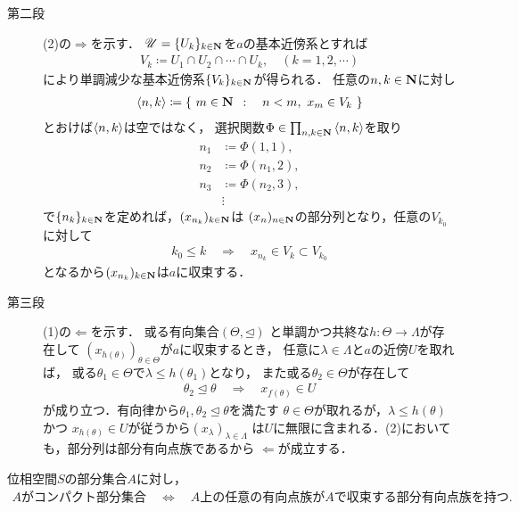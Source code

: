 \begin{prf}
\begin{description}
			\item[第二段] (2)の$\Longrightarrow$を示す．
				$\mathscr{U} = \{U_k\}_{k \in \mathbf{N}}$を$a$の基本近傍系とすれば
				\begin{align}
					V_k \coloneqq U_1 \cap U_2 \cap \cdots \cap U_k,
					\quad (k=1,2,\cdots)
				\end{align}
				により単調減少な基本近傍系$\{V_k\}_{k \in \mathbf{N}}$が得られる．
				任意の$n,k \in \mathbf{N}$に対し
				\begin{align}
					\inprod<n,k> \coloneqq
					\Set{m \in \N}{n < m,\ x_m \in V_k}
				\end{align}
				とおけば$\inprod<n,k>$は空ではなく，
				選択関数$\Phi \in \prod_{n,k \in \N} \inprod<n,k>$を取り
				\begin{align}
					n_1 &\coloneqq \Phi(1,1), \\
					n_2 &\coloneqq \Phi(n_1,2), \\
					n_3 &\coloneqq \Phi(n_2,3), \\
					&\vdots
				\end{align}
				で$\{n_k\}_{k \in \mathbf{N}}$を定めれば，$(x_{n_k})_{k \in \mathbf{N}}$は
				$(x_n)_{n \in \mathbf{N}}$の部分列となり，任意の$V_{k_0}$に対して
				\begin{align}
					k_0 \leq k \quad \Longrightarrow \quad
					x_{n_k} \in V_k \subset V_{k_0}
				\end{align}
				となるから$(x_{n_k})_{k \in \mathbf{N}}$は$a$に収束する．
		
			\item[第三段] (1)の$\Longleftarrow$を示す．
				或る有向集合$(\Theta,\unlhd)$
				と単調かつ共終な$h:\Theta \longrightarrow \Lambda$が存在して
				$(x_{h(\theta)})_{\theta \in \Theta}$が$a$に収束するとき，
				任意に$\lambda \in \Lambda$と$a$の近傍$U$を取れば，
				或る$\theta_1 \in \Theta$で$\lambda \leq h(\theta_1)$となり，
				また或る$\theta_2 \in \Theta$が存在して
				\begin{align}
					\theta_2 \unlhd \theta \quad \Longrightarrow \quad
					x_{f(\theta)} \in U
				\end{align}
				が成り立つ．有向律から$\theta_1,\theta_2 \unlhd \theta$を満たす
				$\theta \in \Theta$が取れるが，$\lambda \leq h(\theta)$かつ
				$x_{h(\theta)} \in U$が従うから$(x_\lambda)_{\lambda \in \Lambda}$
				は$U$に無限に含まれる．(2)においても，部分列は部分有向点族であるから
				$\Longleftarrow$が成立する．
				\QED
		\end{description}
	\end{prf}
	
	\begin{screen}
		\begin{thm}
		\label{thm:compact_iff_every_net_has_a_convergent_subnet}
			位相空間$S$の部分集合$A$に対し，
			\begin{align}
				\mbox{$A$がコンパクト部分集合}
				\quad \Longleftrightarrow \quad
				\mbox{$A$上の任意の有向点族が$A$で収束する部分有向点族を持つ}.
			\end{align}
		\end{thm}
	\end{screen}
	
